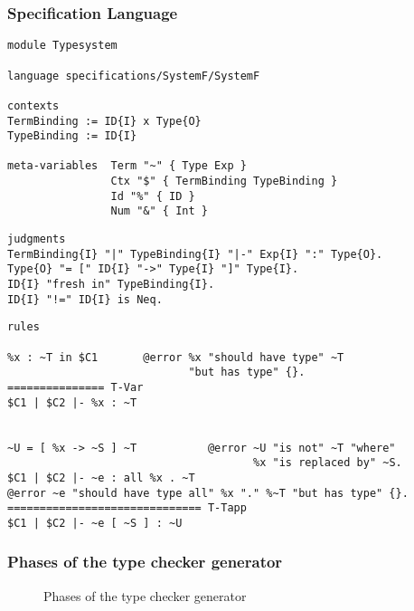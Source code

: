 \documentclass{beamer}
\begin{document}
\begin{frame}
  \frametitle{Specification Language}
\begin{lstlisting}
module Typesystem

language specifications/SystemF/SystemF

contexts
TermBinding := ID{I} x Type{O}
TypeBinding := ID{I}

meta-variables 	Term "~" { Type Exp }
                Ctx "$" { TermBinding TypeBinding }
                Id "%" { ID }
                Num "&" { Int }
\end{lstlisting}
\framebreak{}
\begin{lstlisting}
judgments
TermBinding{I} "|" TypeBinding{I} "|-" Exp{I} ":" Type{O}.
Type{O} "= [" ID{I} "->" Type{I} "]" Type{I}.
ID{I} "fresh in" TypeBinding{I}.
ID{I} "!=" ID{I} is Neq.
\end{lstlisting}
\framebreak{}
\small
\begin{lstlisting}
rules

%x : ~T in $C1       @error %x "should have type" ~T
                            "but has type" {}.
=============== T-Var
$C1 | $C2 |- %x : ~T


~U = [ %x -> ~S ] ~T           @error ~U "is not" ~T "where"
                                      %x "is replaced by" ~S.
$C1 | $C2 |- ~e : all %x . ~T
@error ~e "should have type all" %x "." %~T "but has type" {}.
============================== T-Tapp
$C1 | $C2 |- ~e [ ~S ] : ~U
\end{lstlisting}
\end{frame}

\newcommand*\selectTemplateGeneration{}
\newcommand*\selectTemplateOptimization{}
\newcommand*\selectConstraintGeneration{}
\newcommand*\selectConstraintSolving{}
\begin{frame}[label=overview]
  \frametitle{Phases of the type checker generator}
\begin{figure}
\caption{Phases of the type checker generator}
\label{fig:phases}
\end{figure}
\end{frame}
\end{document}
